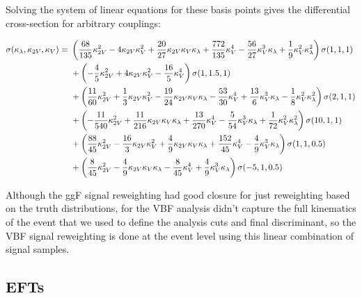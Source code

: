 Solving the system of linear equations for these basis points gives the differential cross-section for arbitrary couplings: 

\begin{align*}
\sigma(\kappa_\lambda, \kappa_{2V}, \kappa_V) = \ & \left(  \frac{68}{135} \kappa_{2V}^2 - 4 \kappa_{2V} \kappa_V^2 + \frac{20}{27} \kappa_{2V} \kappa_V \kappa_\lambda + \frac{772}{135} \kappa_V^4 - \frac{56}{27} \kappa_V^3 \kappa_\lambda + \frac{1}{9} \kappa_V^2 \kappa_\lambda^2 \right) \sigma(1,1,1) \\
&+ \left( - \frac{4}{5} \kappa_{2V}^2 + 4 \kappa_{2V} \kappa_V^2 - \frac{16}{5} \kappa_V^4 \right) \sigma(1, 1.5, 1) \\
&+ \left( \frac{11}{60} \kappa_{2V}^2 + \frac{1}{3} \kappa_{2V} \kappa_V^2 - \frac{19}{24} \kappa_{2V} \kappa_V \kappa_\lambda - \frac{53}{30} \kappa_V^4 + \frac{13}{6} \kappa_V^3 \kappa_\lambda - \frac{1}{8} \kappa_V^2 \kappa_\lambda^2 \right) \sigma(2, 1, 1) \\
&+ \left(- \frac{11}{540} \kappa_{2V}^2 + \frac{11}{216} \kappa_{2V} \kappa_V \kappa_\lambda + \frac{13}{270} \kappa_V^4 - \frac{5}{54} \kappa_V^3 \kappa_\lambda + \frac{1}{72}\kappa_V^2 \kappa_\lambda^2 \right) \sigma(10, 1, 1)\\
&+ \left( \frac{88}{45} \kappa_{2V}^2 - \frac{16}{3} \kappa_{2V} \kappa_V^2 + \frac{4}{9} \kappa_{2V} \kappa_V \kappa_\lambda + \frac{152}{45} \kappa_V^4 - \frac{4}{9} \kappa_V^3 \kappa_\lambda \right) \sigma(1, 1, 0.5)\\
&+ \left( \frac{8}{45} \kappa_{2V}^2 - \frac{4}{9} \kappa_{2V} \kappa_V \kappa_\lambda - \frac{8}{45} \kappa_V^4 + \frac{4}{9} \kappa_V^3 \kappa_\lambda  \right) \sigma(-5, 1, 0.5)
\end{align*}
 
Although the ggF signal reweighting had good closure for just reweighting based on the truth \mhh distributions, for the VBF analysis \mhh didn't capture the full kinematics of the event that we used to define the analysis cuts and final discriminant, so the VBF signal reweighting is done at the event level using this linear combination of signal samples. 

\subsection{EFTs}
\label{subsec:EFTs}
